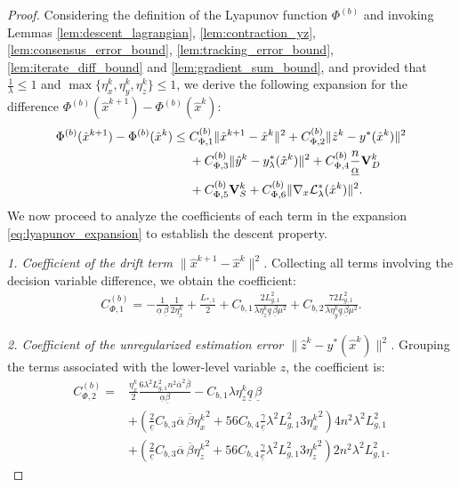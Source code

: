 \documentclass{article}
\theoremstyle{plain}
\theoremstyle{definition}
\theoremstyle{remark}
\begin{document}
\begin{proof}
    Considering the definition of the Lyapunov function $\Phi^{(b)}$ and invoking Lemmas \ref{lem:descent_lagrangian}, \ref{lem:contraction_yz}, \ref{lem:consensus_error_bound}, \ref{lem:tracking_error_bound}, \ref{lem:iterate_diff_bound} and \ref{lem:gradient_sum_bound}, and provided that $\frac{1}{\lambda} \leq 1$ and $\max\{\eta_x^k, \eta_y^k, \eta_z^k\} \leq 1$, we derive the following expansion for the difference $\Phi^{(b)}({\hat{x}}^{k+1}) - \Phi^{(b)}({\hat{x}}^{k})$:
    \begin{align}\label{eq:lyapunov_expansion}
        \Phi^{(b)}({\hat{x}}^{k+1}) - \Phi^{(b)}({\hat{x}}^{k}) \leq {}& C_{\Phi,1}^{(b)} \|\hat{x}^{k+1}-\hat{x}^{k}\|^2 
        + C_{\Phi,2}^{(b)}\|\hat{z}^{k}-y^*(\hat{x}^{k})\|^{2} \notag \\
        &+ C_{\Phi,3}^{(b)}\|\hat{y}^{k}-y_{\lambda}^*(\hat{x}^{k})\|^{2} 
        + C_{\Phi,4}^{(b)}\frac{n}{\underline{\alpha}}\mathbf{V}_{D}^{k} \notag \\
        &+ C_{\Phi,5}^{(b)}\mathbf{V}_{S}^{k} 
        + C_{\Phi,6}^{(b)}\|\nabla_{x} \mathcal{L}_{\lambda}^{*}(\hat{x}^k)\|^2.
    \end{align}
    We now proceed to analyze the coefficients of each term in the expansion \eqref{eq:lyapunov_expansion} to establish the descent property.

    \textit{1. Coefficient of the drift term $\|\hat{x}^{k+1}-\hat{x}^{k}\|^2$.}
    Collecting all terms involving the decision variable difference, we obtain the coefficient:
    \begin{align*}
        C_{\Phi,1}^{(b)} = -\frac{1}{\underline{\alpha} \, \underline{\beta}} \frac{1}{2 \eta_x^{k}} + \frac{L_{*,1}}{2} + C_{b,1} \frac{2 L_{g,1}^2}{\lambda \eta_z^k \underline{q} \, \underline{\beta} \mu^2} + C_{b,2} \frac{72 L_{g,1}^2}{\lambda \eta_y^k \underline{q} \, \underline{\beta} \mu^2}.
    \end{align*}

    \textit{2. Coefficient of the unregularized estimation error $\|\hat{z}^{k}-y^*(\hat{x}^{k})\|^{2}$.}
    Grouping the terms associated with the lower-level variable $z$, the coefficient is:
    \begin{align*}
        C_{\Phi,2}^{(b)} = {}& \frac{\eta_x^{k}}{2} \frac{6\lambda^{2}L_{g,1}^{2}n^2\overline{\alpha}^{2}\overline{\beta}}{\underline{\alpha}\underline{\beta}} - C_{b,1}\lambda\eta_{z}^{k}\underline{q}\,\underline{\beta} \\
        &+ \left(\frac{2}{\underline{c}}C_{b,3}\overline{\alpha}\, \overline{\beta}{\eta_{x}^{k}}^{2} + 56C_{b,4}\frac{\gamma}{\underline{e}}\lambda^{2}L_{g,1}^{2}3{\eta_{x}^{k}}^{2}\right) 4 n^{2}\lambda^{2}L_{g,1}^{2} \\
        &+ \left(\frac{2}{\underline{c}}C_{b,3}\overline{\alpha}\, \overline{\beta}{\eta_{z}^{k}}^{2} + 56C_{b,4}\frac{\gamma}{\underline{e}}\lambda^{2}L_{g,1}^{2}3{\eta_{z}^{k}}^{2}\right) 2 n^{2}\lambda^{2}L_{g,1}^{2}.
    \end{align*}


\end{proof}
\end{document}
